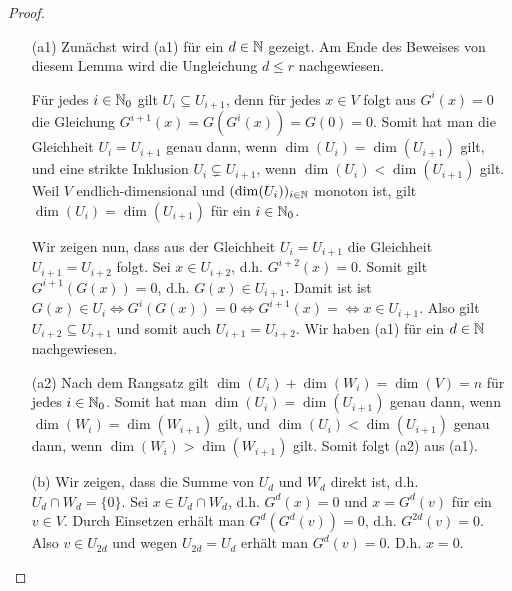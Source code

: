 \begin{proof}\
	\begin{itemize}
		\item[(a1)]
		Zunächst wird (a1) für ein $ d \in \mathbb N $ gezeigt. Am Ende des Beweises von diesem Lemma wird die Ungleichung $ d \leq r $ nachgewiesen.
		
		Für jedes $ i \in \mathbb N_0 $ gilt $ U_i \subseteq U_{i+1} $, denn für jedes $ x \in V $ folgt aus $ G^i(x) = 0 $ die Gleichung $ G^{i+1}(x) = G(G^i(x)) = G(0) = 0 $. Somit hat man die Gleichheit $ U_i = U_{i+1} $ genau dann, wenn $ \dim(U_i) = \dim(U_{i+1}) $ gilt, und eine strikte Inklusion $ U_i \varsubsetneq U_{i+1} $, wenn $ \dim(U_i) < \dim(U_{i+1}) $ gilt. Weil $ V $ endlich-dimensional und $ (\dim(U_i)){}_{i \in \mathbb N} $ monoton ist, gilt $ \dim(U_i) = \dim(U_{i+1}) $ für ein $ i \in \mathbb N_0 $.
		
		Wir zeigen nun, dass aus der Gleichheit $ U_i = U_{i+1} $ die Gleichheit $ U_{i+1} = U_{i+2} $ folgt. Sei $ x \in U_{i+2} $, d.h. $ G^{i+2}(x) = 0 $. Somit gilt $ G^{i+1}(G(x)) = 0 $, d.h. $ G(x) \in U_{i+1} $. Damit ist ist $ G(x) \in U_i \Leftrightarrow G^i(G(x)) = 0 \Leftrightarrow G^{i+1}(x) = \Leftrightarrow x \in U_{i+1} $. Also gilt $ U_{i+2} \subseteq U_{i+1} $ und somit auch $ U_{i+1} = U_{i+2} $. Wir haben (a1) für ein $ d \in \mathbb N $ nachgewiesen.
		\item[(a2)]
		Nach dem Rangsatz gilt $ \dim(U_i) + \dim(W_i) = \dim(V) = n $ für jedes $ i \in \mathbb N_0 $. Somit hat man $ \dim(U_i) = \dim(U_{i+1}) $ genau dann, wenn $ \dim(W_i) = \dim(W_{i+1}) $ gilt, und $ \dim(U_i) < \dim(U_{i+1}) $ genau dann, wenn $ \dim(W_i) > \dim(W_{i+1}) $ gilt. Somit folgt (a2) aus (a1).
		\item[(b)]
		Wir zeigen, dass die Summe von $ U_d $ und $ W_d $ direkt ist, d.h. $ U_d \cap W_d = \{0\} $. Sei $ x \in U_d \cap W_d $, d.h. $ G^d(x) = 0 $ und $ x = G^d(v) $ für ein $ v \in V $. Durch Einsetzen erhält man $ G^d(G^d(v)) = 0 $, d.h. $ G^{2d}(v) = 0 $. Also $ v \in U_{2d} $ und wegen $ U_{2d} = U_d $ erhält man $ G^d(v) = 0 $. D.h. $ x = 0 $.
		

\end{itemize}
\end{proof}
